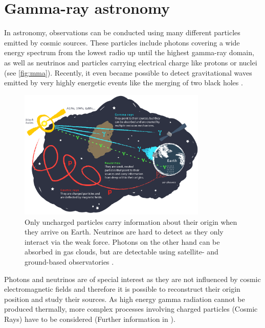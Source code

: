 \chapter{Gamma-ray astronomy}
In astronomy, observations can be conducted using many different particles emitted by cosmic sources. 
These particles include photons covering a wide energy spectrum from the lowest radio up until the highest gamma-ray domain,
as well as neutrinos and particles carrying electrical charge like protons or nuclei (see \autoref{fig:mma}). 
Recently, it even became possible to detect gravitational waves emitted by very highly energetic events like the merging of two black holes \cite{PhysRevLett.116.061102}.
\begin{figure}
    \centering
    \includegraphics[width=0.8\textwidth]{images/cosmic_messengers.png}
    \caption{Only uncharged particles carry information about their origin when they arrive on Earth.
        Neutrinos are hard to detect as they only interact via the weak force.
        Photons on the other hand can be absorbed in gas clouds, but are detectable using satellite- and ground-based observatories \cite{mma_icecube}.
    }
    \label{fig:mma}
\end{figure}

Photons and neutrinos are of special interest as they are not influenced by cosmic electromagnetic fields and therefore it is possible to reconstruct their origin 
position and study their sources.
As high energy gamma radiation cannot be produced thermally, more complex processes involving charged particles (Cosmic Rays) have to be considered 
(Further information in \cite{s_funk}).

